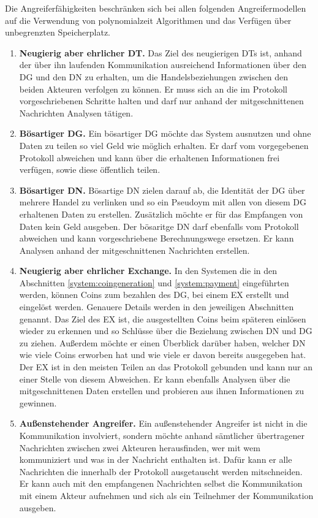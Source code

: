 \documentclass[
	fontsize=11pt,
	headings=small,
	parskip=half,           %
	bibliography=totoc,
	numbers=noenddot,       %
	open=any,               %
]{scrreprt}
\begin{document}
Die Angreiferfähigkeiten beschränken sich bei allen folgenden Angreifermodellen auf die Verwendung von polynomialzeit Algorithmen und das Verfügen über unbegrenzten Speicherplatz.
\begin{enumerate}
    \item \textbf{Neugierig aber ehrlicher DT.} Das Ziel des neugierigen DTs ist, anhand der über ihn laufenden Kommunikation ausreichend Informationen über den DG und den DN zu erhalten, um die Handelsbeziehungen zwischen den beiden Akteuren verfolgen zu können. Er muss sich an die im Protokoll vorgeschriebenen Schritte halten und darf nur anhand der mitgeschnittenen Nachrichten Analysen tätigen.
    \item \textbf{Bösartiger DG.} Ein bösartiger DG möchte das System ausnutzen und ohne Daten zu teilen so viel Geld wie möglich erhalten. Er darf vom vorgegebenen Protokoll abweichen und kann über die erhaltenen Informationen frei verfügen, sowie diese öffentlich teilen.
    \item \textbf{Bösartiger DN.} Bösartige DN zielen darauf ab, die Identität der DG über mehrere Handel zu verlinken und so ein Pseudoym mit allen von diesem DG erhaltenen Daten zu erstellen. Zusätzlich möchte er für das Empfangen von Daten kein Geld ausgeben. Der bösaritge DN darf ebenfalls vom Protokoll abweichen und kann vorgeschriebene Berechnungswege ersetzen. Er kann Analysen anhand der mitgeschnittenen Nachrichten erstellen.
    \item \textbf{Neugierig aber ehrlicher Exchange.} In den Systemen die in den Abschnitten \ref{system:coingeneration} und \ref{system:payment} eingeführten werden, können Coins zum bezahlen des DG, bei einem EX erstellt und eingelöst werden. Genauere Details werden in den jeweiligen Abschnitten genannt. Das Ziel des EX ist, die ausgestellten Coins beim späteren einlösen wieder zu erkennen und so Schlüsse über die Beziehung zwischen DN und DG zu ziehen. Außerdem möchte er einen Überblick darüber haben, welcher DN wie viele Coins erworben hat und wie viele er davon bereits ausgegeben hat. Der EX ist in den meisten Teilen an das Protokoll gebunden und kann nur an einer Stelle von diesem Abweichen. Er kann ebenfalls Analysen über die mitgeschnittenen Daten erstellen und probieren aus ihnen Informationen zu gewinnen.
    \item \textbf{Außenstehender Angreifer.} Ein außenstehender Angreifer ist nicht in die Kommunikation involviert, sondern möchte anhand sämtlicher übertragener Nachrichten zwischen zwei Akteuren herausfinden, wer mit wem kommuniziert und was in der Nachricht enthalten ist. Dafür kann er alle Nachrichten die innerhalb der Protokoll ausgetauscht werden mitschneiden. Er kann auch mit den empfangenen Nachrichten selbst die Kommunikation mit einem Akteur aufnehmen und sich als ein Teilnehmer der Kommunikation ausgeben.
\end{enumerate}
\end{document}
